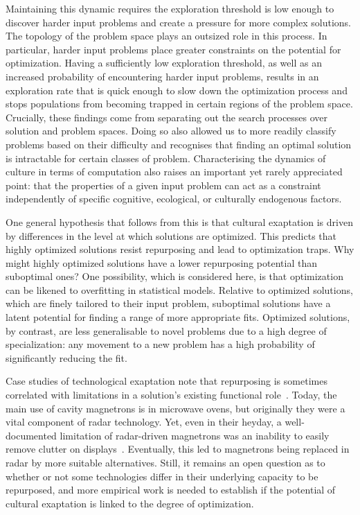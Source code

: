 \documentclass{article}
\begin{document}
Maintaining this dynamic requires the exploration threshold is low enough to discover harder input problems and create a pressure for more complex solutions. The topology of the problem space plays an outsized role in this process. In particular, harder input problems place greater constraints on the potential for optimization. Having a sufficiently low exploration threshold, as well as an increased probability of encountering harder input problems, results in an exploration rate that is quick enough to slow down the optimization process and stops populations from becoming trapped in certain regions of the problem space. Crucially, these findings come from separating out the search processes over solution and problem spaces. Doing so also allowed us to more readily classify problems based on their difficulty and recognises that finding an optimal solution is intractable for certain classes of problem. Characterising the dynamics of culture in terms of computation also raises an important yet rarely appreciated point: that the properties of a given input problem can act as a constraint independently of specific cognitive, ecological, or culturally endogenous factors.

One general hypothesis that follows from this is that cultural exaptation is driven by differences in the level at which solutions are optimized. This predicts that highly optimized solutions resist repurposing and lead to optimization traps. Why might highly optimized solutions have a lower repurposing potential than suboptimal ones? One possibility, which is considered here, is that optimization can be likened to overfitting in statistical models. Relative to optimized solutions, which are finely tailored to their input problem, suboptimal solutions have a latent potential for finding a range of more appropriate fits. Optimized solutions, by contrast, are less generalisable to novel problems due to a high degree of specialization: any movement to a new problem has a high probability of significantly reducing the fit.

Case studies of technological exaptation note that repurposing is sometimes correlated with limitations in a solution's existing functional role~\cite{arthur2009nature}. Today, the main use of cavity magnetrons is in microwave ovens, but originally they were a vital component of radar technology. Yet, even in their heyday, a well-documented limitation of radar-driven magnetrons was an inability to easily remove clutter on displays~\cite{brookner201010}. Eventually, this led to magnetrons being replaced in radar by more suitable alternatives. Still, it remains an open question as to whether or not some technologies differ in their underlying capacity to be repurposed, and more empirical work is needed to establish if the potential of cultural exaptation is linked to the degree of optimization.
\end{document}
